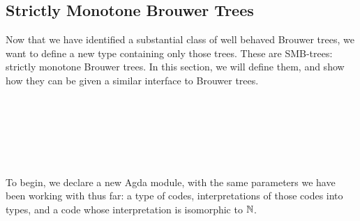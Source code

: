 
\subsection{Strictly Monotone Brouwer Trees}

Now that we have identified a substantial class of well behaved Brouwer trees,
we want to define a new type containing only those trees.
These are SMB-trees: strictly monotone Brouwer trees.
In this section, we will define them, and show how
they can be given a similar interface to Brouwer trees.

\begin{code}[hide]%
\>[0]\AgdaSpace{}%
\AgdaSpace{}%
\AgdaSpace{}%
\AgdaSpace{}%
\AgdaSymbol{(}\AgdaSpace{}%
\AgdaSymbol{;}\AgdaSpace{}%
\AgdaOperator{\AgdaFunction{\AgdaUnderscore{}<\AgdaUnderscore{}}}\AgdaSymbol{)}\<%
\\
\>[0]\AgdaSpace{}%
\AgdaSpace{}%
\<%
\\
\>[0]\AgdaSpace{}%
\AgdaSpace{}%
\<%
\\
\>[0]\AgdaSpace{}%
\AgdaSpace{}%
\<%
\\
\>[0]\AgdaSpace{}%
\AgdaSpace{}%
\<%
\\
\>[0]\AgdaSpace{}%
\AgdaSpace{}%
\<%
\end{code}

To begin, we declare a new Agda module, with the same parameters
we have been working with thus far: a type of codes, interpretations of those codes into types,
and a code whose interpretation is isomorphic to ${\mathbb{N}}$.
\begin{code}%
\>[0]\AgdaSpace{}%
\AgdaSpace{}%
\AgdaSymbol{\{}\AgdaSymbol{\}}\<%
\\
\>[0][@{}l@{\AgdaIndent{0}}]%
\>[4]\AgdaSymbol{(}\AgdaSpace{}%
\AgdaSymbol{:}\AgdaSpace{}%
\AgdaSpace{}%
\AgdaSymbol{)}\<%
\\
%
\>[4]\AgdaSymbol{(}\AgdaSpace{}%
\AgdaSymbol{:}\AgdaSpace{}%
\AgdaSpace{}%
\AgdaSpace{}%
\AgdaSpace{}%
\AgdaSymbol{)}\<%
\\
%
\>[4]\AgdaSymbol{(}\AgdaSpace{}%
\AgdaSymbol{:}\AgdaSpace{}%
\AgdaSymbol{)}\AgdaSpace{}%
\AgdaSymbol{(}\AgdaSpace{}%
\AgdaSymbol{:}\AgdaSpace{}%
\AgdaSpace{}%
\AgdaSymbol{(}\AgdaSpace{}%
\AgdaSymbol{)}\AgdaSpace{}%
\AgdaSpace{}%
\AgdaSymbol{)}\AgdaSpace{}%
\<%
\end{code}

